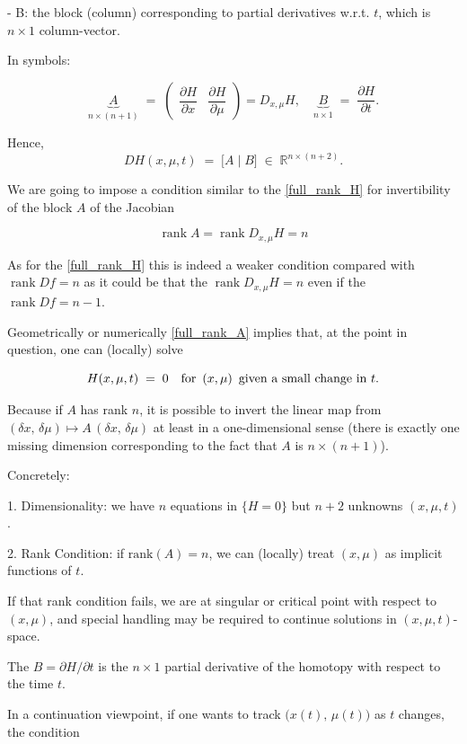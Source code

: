 \documentclass[11pt,american]{article}
\DeclareMathOperator{\rank}{\operatorname{rank}}
\begin{document}
- B: the block (column) corresponding to partial derivatives w.r.t. $t$, which is $n \times 1$ column-vector.

In symbols:

\[
\underbrace{A}_{n\times(n+1)}
\;=\;
\begin{pmatrix}
\dfrac{\partial H}{\partial x} & \dfrac{\partial H}{\partial \mu}
\end{pmatrix} = D_{x,\mu} H,
\quad
\underbrace{B}_{n\times1}
\;=\;
\dfrac{\partial H}{\partial t}.
\]

Hence,
\[
DH(x,\mu,t) 
\;=\;
\bigl[A \;\big|\; B\bigr]
\;\in\;\mathbb{R}^{n\times(n+2)}.
\]

We are going to impose a condition similar to the \eqref{full_rank_H} for invertibility of the block $A$ of the Jacobian

\begin{equation}\label{full_rank_A}
\rank A = \rank D_{x,\mu} H = n
\end{equation}

As for the \eqref{full_rank_H} this is indeed a weaker condition compared with $\rank D f = n$ as it could be that the $\rank D_{x,\mu} H = n$ even if the $\rank D f = n - 1$.

Geometrically or numerically \eqref{full_rank_A} implies that, at the point in question, one can (locally) solve

\[
H(x,\mu,t)\;=\;0
\quad\text{for $\,(x,\mu)$\, given a small change in $t$.}
\]

Because if $A$ has rank $n$, it is possible to invert the linear map from $(\delta x,\,\delta\mu)\mapsto A\,(\delta x,\,\delta\mu)$ at least in a one-dimensional sense (there is exactly one missing dimension corresponding to the fact that $A$ is $n\times(n+1)$). 

Concretely:

1. Dimensionality: we have $n$ equations in $\{H=0\}$ but $n+2$ unknowns $(x,\mu,t)$.
  
2. Rank Condition: if $\mathrm{rank}(A)=n$, we can (locally) treat $(x,\mu)$ as implicit functions of $t$.  

If that rank condition fails, we are at singular or critical point with respect to $(x,\mu)$, and special handling may be required to continue solutions in $(x,\mu,t)$-space.

The $B = \partial H/\partial t$ is the $n\times1$ partial derivative of the homotopy with respect to the time $t$.

In a continuation viewpoint, if one wants to track $\bigl(x(t),\,\mu(t)\bigr)$ as $t$ changes, the condition
\end{document}
